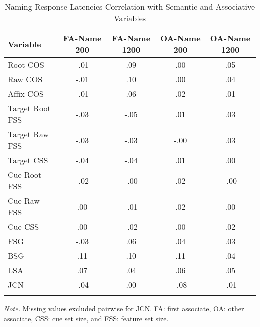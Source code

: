 \documentclass[english,man]{apa6}
\theoremstyle{definition}
\theoremstyle{definition}
\theoremstyle{definition}
\theoremstyle{remark}
\begin{document}
\begin{table}[tbp]
\begin{center}
\begin{threeparttable}
\caption{\label{tab:name-table}Naming Response Latencies Correlation with Semantic and Associative Variables}
\begin{tabular}{lcccc}
\toprule
Variable & \multicolumn{1}{c}{FA-Name 200} & \multicolumn{1}{c}{FA-Name 1200} & \multicolumn{1}{c}{OA-Name 200} & \multicolumn{1}{c}{OA-Name 1200}\\
\midrule
Root COS & -.01 & .09 & .00 & .05\\
Raw COS & -.01 & .10 & .00 & .04\\
Affix COS & -.01 & .06 & .02 & .01\\
Target Root FSS & -.03 & -.05 & .01 & .03\\
Target Raw FSS & -.03 & -.03 & -.00 & .03\\
Target CSS & -.04 & -.04 & .01 & .00\\
Cue Root FSS & -.02 & -.00 & .02 & -.00\\
Cue Raw FSS & .00 & -.01 & .02 & .00\\
Cue CSS & .00 & -.02 & .00 & .02\\
FSG & -.03 & .06 & .04 & .03\\
BSG & .11 & .10 & .11 & .04\\
LSA & .07 & .04 & .06 & .05\\
JCN & -.04 & .00 & -.08 & -.01\\
\bottomrule
\addlinespace
\end{tabular}
\begin{tablenotes}[para]
\textit{Note.} Missing values excluded pairwise for JCN. FA: first associate, OA: other associate, CSS: cue set size, and FSS: feature set size.
\end{tablenotes}
\end{threeparttable}
\end{center}
\end{table}
\end{document}
